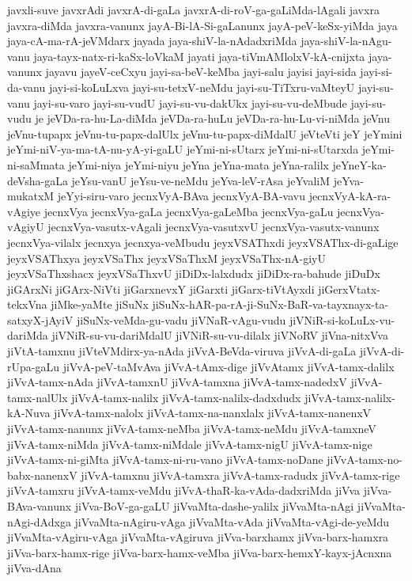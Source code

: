 {javxli-suve
javxrAdi
javxrA-di-gaLa
javxrA-di-roV-ga-gaLiMda-lAgali
javxra
javxra-diMda
javxra-vanunx
jayA-Bi-lA-Si-gaLanunx
jayA-peV-keSx-yiMda
jaya
jaya-cA-ma-rA-jeVMdarx
jayada
jaya-shiV-la-nAdadxriMda
jaya-shiV-la-nAgu-vanu
jaya-tayx-natx-ri-kaSx-loVkaM
jayati
jaya-tiVmAMlolxV-kA-cnijxta
jaya-vanunx
jayavu
jayeV-ceCxyu
jayi-sa-beV-keMba
jayi-salu
jayisi
jayi-sida
jayi-si-da-vanu
jayi-si-koLuLxva
jayi-su-tetxV-neMdu
jayi-su-TiTxru-vaMteyU
jayi-su-vanu
jayi-su-varo
jayi-su-vudU
jayi-su-vu-dakUkx
jayi-su-vu-deMbude
jayi-su-vudu
je
jeVDa-ra-hu-La-diMda
jeVDa-ra-huLu
jeVDa-ra-hu-Lu-vi-niMda
jeVnu
jeVnu-tupapx
jeVnu-tu-papx-dalUlx
jeVnu-tu-papx-diMdalU
jeVteVti
jeY
jeYmini
jeYmi-niV-ya-ma-tA-nu-yA-yi-gaLU
jeYmi-ni-sUtarx
jeYmi-ni-sUtarxda
jeYmi-ni-saMmata
jeYmi-niya
jeYmi-niyu
jeYna
jeYna-mata
jeYna-ralilx
jeYneY-ka-deVsha-gaLa
jeYsu-vanU
jeYsu-ve-neMdu
jeYva-leV-rAsa
jeYvaliM
jeYva-mukatxM
jeYyi-siru-varo
jecnxVyA-BAva
jecnxVyA-BA-vavu
jecnxVyA-kA-ra-vAgiye
jecnxVya
jecnxVya-gaLa
jecnxVya-gaLeMba
jecnxVya-gaLu
jecnxVya-vAgiyU
jecnxVya-vasutx-vAgali
jecnxVya-vasutxvU
jecnxVya-vasutx-vanunx
jecnxVya-vilalx
jecnxya
jecnxya-veMbudu
jeyxVSAThxdi
jeyxVSAThx-di-gaLige
jeyxVSAThxya
jeyxVSaThx
jeyxVSaThxM
jeyxVSaThx-nA-giyU
jeyxVSaThxshacx
jeyxVSaThxvU
jiDiDx-lalxdudx
jiDiDx-ra-bahude
jiDuDx
jiGArxNi
jiGArx-NiVti
jiGarxnevxY
jiGarxti
jiGarx-tiVtAyxdi
jiGerxVtatx-tekxVna
jiMke-yaMte
jiSuNx
jiSuNx-hAR-pa-rA-ji-SuNx-BaR-va-tayxnayx-ta-satxyX-jAyiV
jiSuNx-veMda-gu-vadu
jiVNaR-vAgu-vudu
jiVNiR-si-koLuLx-vu-dariMda
jiVNiR-su-vu-dariMdalU
jiVNiR-su-vu-dilalx
jiVNoRV
jiVna-nitxVva
jiVtA-tamxnu
jiVteVMdirx-ya-nAda
jiVvA-BeVda-viruva
jiVvA-di-gaLa
jiVvA-di-rUpa-gaLu
jiVvA-peV-taMvAva
jiVvA-tAmx-dige
jiVvAtamx
jiVvA-tamx-dalilx
jiVvA-tamx-nAda
jiVvA-tamxnU
jiVvA-tamxna
jiVvA-tamx-nadedxV
jiVvA-tamx-nalUlx
jiVvA-tamx-nalilx
jiVvA-tamx-nalilx-dadxdudx
jiVvA-tamx-nalilx-kA-Nuva
jiVvA-tamx-nalolx
jiVvA-tamx-na-nanxlalx
jiVvA-tamx-nanenxV
jiVvA-tamx-nanunx
jiVvA-tamx-neMba
jiVvA-tamx-neMdu
jiVvA-tamxneV
jiVvA-tamx-niMda
jiVvA-tamx-niMdale
jiVvA-tamx-nigU
jiVvA-tamx-nige
jiVvA-tamx-ni-giMta
jiVvA-tamx-ni-ru-vano
jiVvA-tamx-noDane
jiVvA-tamx-no-babx-nanenxV
jiVvA-tamxnu
jiVvA-tamxra
jiVvA-tamx-radudx
jiVvA-tamx-rige
jiVvA-tamxru
jiVvA-tamx-veMdu
jiVvA-thaR-ka-vAda-dadxriMda
jiVva
jiVva-BAva-vanunx
jiVva-BoV-ga-gaLU
jiVvaMta-dashe-yalilx
jiVvaMta-nAgi
jiVvaMta-nAgi-dAdxga
jiVvaMta-nAgiru-vAga
jiVvaMta-vAda
jiVvaMta-vAgi-de-yeMdu
jiVvaMta-vAgiru-vAga
jiVvaMta-vAgiruva
jiVva-barxhamx
jiVva-barx-hamxra
jiVva-barx-hamx-rige
jiVva-barx-hamx-veMba
jiVva-barx-hemxY-kayx-jAcnxna
jiVva-dAna
}
